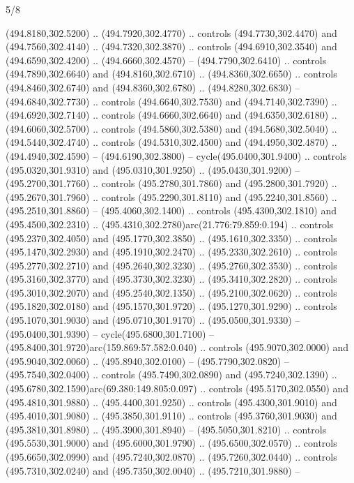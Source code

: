 \begin{flagdescription}{5/8}
\begin{scope}[xshift=0.5\flaglength,yshift=0.5\flagwidth,scale=\flagwidth/475.63]
\begin{scope}[y=0.8pt, x=0.8pt, yscale=-1, xscale=1,shift={(-450,-300)}]
\begin{scope}[cm={{1.0,0.0,0.0,1.0,(-0.0002,0.12556)}},cm={{1.0,0.0,0.0,1.0,(0.00179,0.0)}}]
\begin{scope}[cm={{1.11592,0.0,0.0,1.11592,(-106.89933,-41.77764)}}]
\begin{scope}[draw=black,fill=cfff]
\begin{scope}[fill=black]
  (494.8180,302.5200) .. (494.7920,302.4770) .. controls (494.7730,302.4470) and
  (494.7560,302.4140) .. (494.7320,302.3870) .. controls (494.6910,302.3540) and
  (494.6590,302.4200) .. (494.6660,302.4570) -- (494.7790,302.6410) .. controls
  (494.7890,302.6640) and (494.8160,302.6710) .. (494.8360,302.6650) .. controls
  (494.8460,302.6740) and (494.8360,302.6780) .. (494.8280,302.6830) --
  (494.6840,302.7730) .. controls (494.6640,302.7530) and (494.7140,302.7390) ..
  (494.6920,302.7140) .. controls (494.6660,302.6640) and (494.6350,302.6180) ..
  (494.6060,302.5700) .. controls (494.5860,302.5380) and (494.5680,302.5040) ..
  (494.5440,302.4740) .. controls (494.5310,302.4500) and (494.4950,302.4870) ..
  (494.4940,302.4590) -- (494.6190,302.3800) -- cycle(495.0400,301.9400) ..
  controls (495.0320,301.9310) and (495.0310,301.9250) .. (495.0430,301.9200) --
  (495.2700,301.7760) .. controls (495.2780,301.7860) and (495.2800,301.7920) ..
  (495.2670,301.7960) .. controls (495.2290,301.8110) and (495.2240,301.8560) ..
  (495.2510,301.8860) -- (495.4060,302.1400) .. controls (495.4300,302.1810) and
  (495.4500,302.2310) .. (495.4310,302.2780)arc(21.776:79.859:0.194) .. controls
  (495.2370,302.4050) and (495.1770,302.3850) .. (495.1610,302.3350) .. controls
  (495.1470,302.2930) and (495.1910,302.2470) .. (495.2330,302.2610) .. controls
  (495.2770,302.2710) and (495.2640,302.3230) .. (495.2760,302.3530) .. controls
  (495.3160,302.3770) and (495.3730,302.3230) .. (495.3410,302.2820) .. controls
  (495.3010,302.2070) and (495.2540,302.1350) .. (495.2100,302.0620) .. controls
  (495.1820,302.0180) and (495.1570,301.9720) .. (495.1270,301.9290) .. controls
  (495.1070,301.9030) and (495.0710,301.9170) .. (495.0500,301.9330) --
  (495.0400,301.9390) -- cycle(495.6800,301.7100) --
  (495.8400,301.9720)arc(159.869:57.582:0.040) .. controls (495.9070,302.0000)
  and (495.9040,302.0060) .. (495.8940,302.0100) -- (495.7790,302.0820) --
  (495.7540,302.0400) .. controls (495.7490,302.0890) and (495.7240,302.1390) ..
  (495.6780,302.1590)arc(69.380:149.805:0.097) .. controls (495.5170,302.0550)
  and (495.4810,301.9880) .. (495.4400,301.9250) .. controls (495.4300,301.9010)
  and (495.4010,301.9080) .. (495.3850,301.9110) .. controls (495.3760,301.9030)
  and (495.3810,301.8980) .. (495.3900,301.8940) -- (495.5050,301.8210) ..
  controls (495.5530,301.9000) and (495.6000,301.9790) .. (495.6500,302.0570) ..
  controls (495.6650,302.0990) and (495.7240,302.0870) .. (495.7260,302.0440) ..
  controls (495.7310,302.0240) and (495.7350,302.0040) .. (495.7210,301.9880) --

\end{scope}
\end{scope}
\end{scope}
\end{scope}
\end{scope}
\end{scope}
\end{flagdescription}
